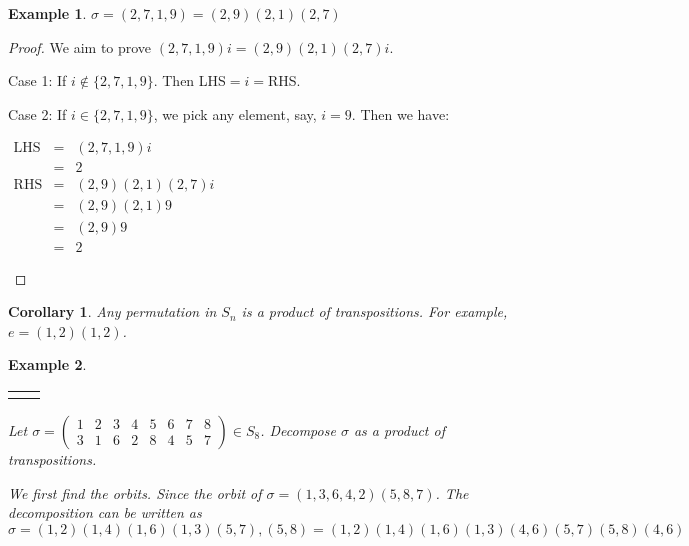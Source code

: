 \documentclass{article}
\theoremstyle{MyNonumberplain}
\theoremstyle{break}
\newtheorem*{proof}{Proof. }
\newcommand{\nline}{\begin{tabular}{ll}&\\\end{tabular}}
\newcommand{\nin}{\not\in}
\newcommand{\tmop}{\text}
\theoremstyle{break}
\newtheorem{corollary}{Corollary}[theorem]
\newtheorem{example}{Example}[section]
\theoremstyle{break}
\theoremstyle{definition}
\theoremstyle{break}
\begin{document}
\begin{expbox}
    \begin{example}
        $\sigma = (2, 7, 1, 9) = (2, 9) (2, 1) (2, 7)$
    \end{example}
    \begin{prfbox}
        \begin{proof}
            We aim to prove $(2, 7, 1, 9) i = (2, 9) (2, 1) (2, 7) i$.\bigskip

            Case 1: If $i \nin  \{ 2, 7, 1, 9 \}$. Then LHS$=i=$RHS.\bigskip

            Case 2: If $i \in \{ 2, 7, 1, 9 \}$, we pick any element, say, $i=9$. Then we have:\\

            \begin{center}
                $\begin{array}{lll}
                    \tmop{LHS} & = & (2, 7, 1, 9) i\\
                    & = & 2\\
                    \tmop{RHS} & = & (2, 9) (2, 1) (2, 7) i\\
                    & = & (2, 9) (2, 1) 9\\
                    & = & (2, 9) 9\\
                    & = & 2
                \end{array}$
            \end{center}
        \end{proof}
    \end{prfbox}
\end{expbox}

\begin{thmbox}
    \begin{corollary}
        Any permutation in $S_n$ is a product of transpositions. For example, $e=(1,2)(1,2)$.
    \end{corollary}
\end{thmbox}

\begin{expbox}
    \begin{example}

        \nline

        Let $\sigma = \left(\begin{array}{cccccccc}
            1 & 2 & 3 & 4 & 5 & 6 & 7 & 8\\
            3 & 1 & 6 & 2 & 8 & 4 & 5 & 7
        \end{array}\right) \in S_8$. Decompose $\sigma$ as a product of
        transpositions.

        \begin{ansbox}
            We first find the orbits. Since the orbit of $\sigma = (1, 3, 6, 4, 2) (5, 8,
            7)$. The decomposition can be written as
            \[ \sigma = (1, 2) (1, 4) (1, 6) (1, 3) (5, 7), (5, 8) = (1, 2) (1, 4) (1, 6)
            (1, 3) (4, 6) (5, 7) (5, 8) (4, 6) \]
    
        \end{ansbox}

    \end{example}
\end{expbox}
\end{document}
